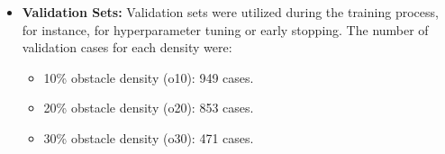 \begin{itemize}
\begin{itemize}
        \item \textbf{Validation Sets:} Validation sets were utilized during the training process, for instance, for hyperparameter tuning or early stopping. The number of validation cases for each density were:
            \begin{itemize}
                \item 10\% obstacle density (o10): 949 cases.
                \item 20\% obstacle density (o20): 853 cases.
                \item 30\% obstacle density (o30): 471 cases.
            \end{itemize}
    \end{itemize}
    \newpage %
\end{itemize}


